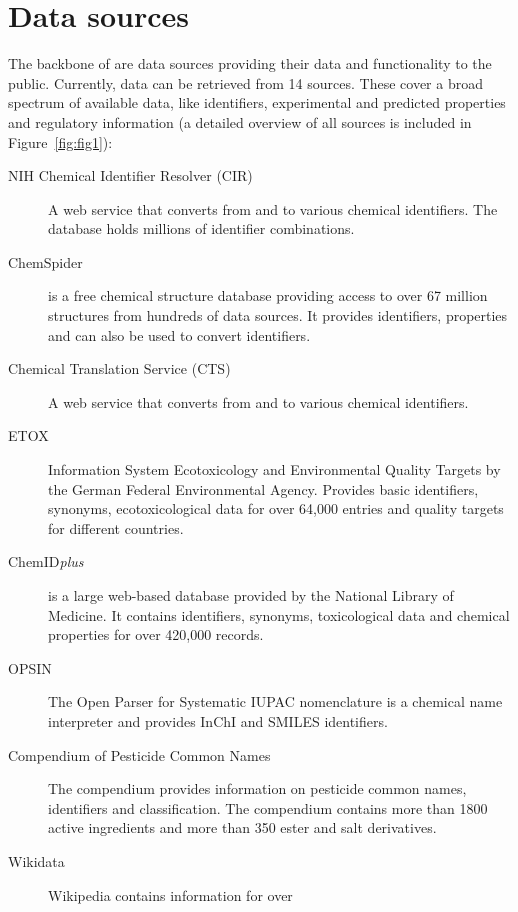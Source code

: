\documentclass[article]{jss}
\begin{document}
\section[Data sources]{Data sources}\label{sec:data-sources}
The backbone of  are data sources providing their data
and functionality to the public.  Currently, data can be retrieved
from 14 sources.  These cover a broad spectrum of available data, like
identifiers, experimental and predicted properties and regulatory
information (a detailed overview of all sources is included in
Figure~\ref{fig:fig1}):

\begin{description}
\item[NIH Chemical Identifier Resolver (CIR)]{\citep{cir} A web
    service that converts from and to various chemical identifiers. The database holds millions of identifier combinations.}
\item[ChemSpider]{\citep{pence_chemspider:_2010} is a free chemical
	structure database providing access to over 67 million
	structures from hundreds of data sources. It provides identifiers, properties and can also be
	used to convert identifiers.}
\item[Chemical Translation Service (CTS)]{
  \citep{Wohlgemuth_Haldiya_Willighagen_Kind_Fiehn_2010} A web
    service that converts from and to various chemical identifiers.}
\item[ETOX]{\citep{etox} Information System Ecotoxicology and
    Environmental Quality Targets by the German Federal Environmental
    Agency. Provides basic identifiers, synonyms, ecotoxicological
    data for over 64,000 entries and quality targets for different countries.}
\item[ChemID\emph{plus}]{\citep{Tomasulo_2002} is a large web-based
	database provided by the National Library of Medicine. It contains
	identifiers, synonyms, toxicological data and chemical
	properties for over 420,000 records.}
\item[OPSIN]{\citep{Lowe_Corbett_Murray-Rust_Glen_2011} The Open
	Parser for Systematic IUPAC nomenclature is a chemical name
	interpreter and provides InChI and SMILES identifiers.}
\item[Compendium of Pesticide Common Names]{\citep{wood} The
	compendium provides information on pesticide common names,
	identifiers and classification. The compendium contains more than 1800 active ingredients and more than 350 ester and salt derivatives. }
\item[Wikidata]{\citep{wiki} Wikipedia contains information for over
}
\end{description}
\end{document}
